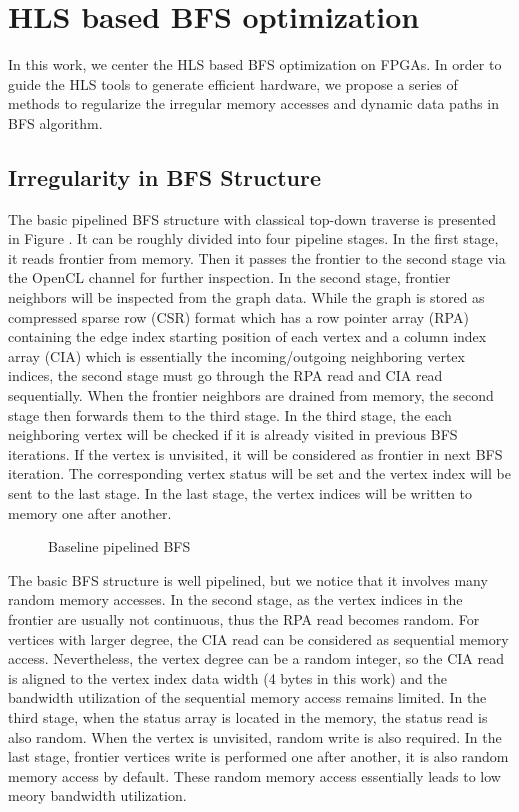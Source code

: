 \section{HLS based BFS optimization} \label{sec:bfs-opt}
In this work, we center the HLS based BFS optimization on FPGAs. 
In order to guide the HLS tools to generate efficient hardware, 
we propose a series of methods to regularize the irregular memory 
accesses and dynamic data paths in BFS algorithm. 

\subsection{Irregularity in BFS Structure}
The basic pipelined BFS structure with classical top-down traverse 
is presented in Figure \cite{fig:base-bfs}. It can be roughly 
divided into four pipeline stages. In the first stage, it reads 
frontier from memory. Then it passes the frontier to the second stage
via the OpenCL channel for further inspection. In the second stage, 
frontier neighbors will be inspected from the graph data. While the 
graph is stored as compressed sparse row (CSR) format which has a row 
pointer array (RPA) containing the edge index starting position of each 
vertex and a column index array (CIA) which is essentially the incoming/outgoing 
neighboring vertex indices, the second stage must go through the RPA read and 
CIA read sequentially. When the frontier neighbors are 
drained from memory, the second stage then forwards them to the third stage.
In the third stage, the each neighboring vertex will be checked if it is 
already visited in previous BFS iterations. If the vertex is unvisited, 
it will be considered as frontier in next BFS iteration. The corresponding 
vertex status will be set and the vertex index will be sent to the last stage.
In the last stage, the vertex indices will be written to memory one 
after another.

\begin{figure}
    \caption{Baseline pipelined BFS}
\label{fig:base-bfs}
\end{figure}

The basic BFS structure is well pipelined, but we notice that it involves many 
random memory accesses. In the second stage, as the vertex indices in the frontier 
are usually not continuous, thus the RPA read becomes random. For vertices with 
larger degree, the CIA read can be considered as sequential memory access. Nevertheless, 
the vertex degree can be a random integer, so the CIA read is aligned to 
the vertex index data width (4 bytes in this work) and the bandwidth utilization of 
the sequential memory access remains limited. In the third stage, when the status array 
is located in the memory, the status read is also random. When the vertex is unvisited, 
random write is also required. In the last stage, frontier vertices write is performed one 
after another, it is also random memory access by default. These random memory access 
essentially leads to low meory bandwidth utilization. 

